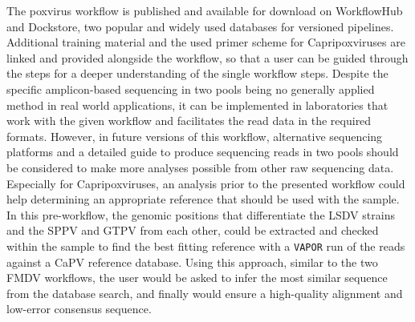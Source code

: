 
The poxvirus workflow is published and available for download on WorkflowHub and Dockstore, two popular and widely used databases for versioned pipelines. Additional training material and the used primer scheme for Capripoxviruses are linked and provided alongside the workflow, so that a user can be guided through the steps for a deeper understanding of the single workflow steps. Despite the specific amplicon-based sequencing in two pools being no generally applied method in real world applications, it can be implemented in laboratories that work with the given workflow and facilitates the read data in the required formats. However, in future versions of this workflow, alternative sequencing platforms and a detailed guide to produce sequencing reads in two pools should be considered to make more analyses possible from other raw sequencing data. Especially for Capripoxviruses, an analysis prior to the presented workflow could help determining an appropriate reference that should be used with the sample. In this pre-workflow, the genomic positions that differentiate the \ac{LSDV} strains and the \ac{SPPV} and \ac{GTPV} from each other, could be extracted and checked within the sample to find the best fitting reference with a \texttt{VAPOR} run of the reads against a \ac{CaPV} reference database. Using this approach, similar to the two \ac{FMDV} workflows, the user would be asked to infer the most similar sequence from the database search, and finally would ensure a high-quality alignment and low-error consensus sequence.


